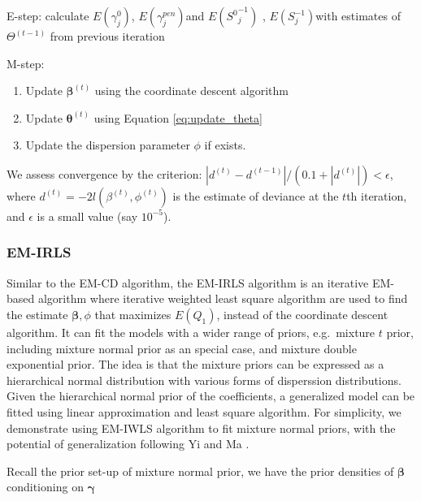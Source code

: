 \documentclass[AMA,STIX1COL,]{WileyNJD-v2}
\begin{document}
E-step: calculate \(E(\gamma^0_{j})\), \(E(\gamma^{pen}_{j})\)and
\(E({S^0}^{-1}_{j})\) , \(E({S}^{-1}_{j})\)with estimates of
\(\Theta^{(t-1)}\) from previous iteration

M-step:

\begin{enumerate}
\def\labelenumi{\alph{enumi})}
\item
  Update \(\boldsymbol{\beta}^{(t)}\) using the coordinate descent
  algorithm
\item
  Update \(\boldsymbol{\theta}^{(t)}\) using Equation
  \ref{eq:update_theta}
\item
  Update the dispersion parameter \(\phi\) if exists.
\end{enumerate}

We assess convergence by the criterion:
\(|d^{(t)}-d^{(t-1)}|/(0.1+|d^{(t)}|)<\epsilon\), where
\(d^{(t)} = -2l(\beta^{(t)},\phi^{(t)})\) is the estimate of deviance at
the \(t\)th iteration, and \(\epsilon\) is a small value (say
\(10^{-5}\)).

\hypertarget{em-irls}{%
\subsubsection{EM-IRLS}\label{em-irls}}

Similar to the EM-CD algorithm, the EM-IRLS algorithm is an iterative
EM-based algorithm where iterative weighted least square algorithm are
used to find the estimate \(\boldsymbol{\beta}, \phi\) that maximizes
\(E(Q_1)\), instead of the coordinate descent algorithm. It can fit the
models with a wider range of priors, e.g.~mixture \(t\) prior, including
mixture normal prior as an special case, and mixture double exponential
prior. The idea is that the mixture priors can be expressed as a
hierarchical normal distribution with various forms of disperssion
distributions. \citep{Yi2012} Given the hierarchical normal prior of the
coefficients, a generalized model can be fitted using linear
approximation and least square algorithm. For simplicity, we demonstrate
using EM-IWLS algorithm to fit mixture normal priors, with the potential
of generalization following Yi and Ma \citep{Yi2012}.

Recall the prior set-up of mixture normal prior, we have the prior
densities of \(\boldsymbol{\beta}\) conditioning on
\(\boldsymbol{\gamma}\)
\end{document}
